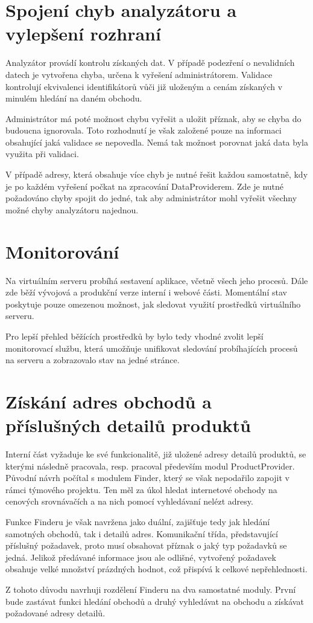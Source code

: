 \documentclass[thesis=B,czech]{FITthesis}[2012/06/26]
\begin{document}
\section{Spojení chyb analyzátoru a vylepšení rozhraní} \label{analyser-join}
Analyzátor provádí kontrolu získaných dat. V případě podezření o nevalidních datech je vytvořena chyba, určena k vyřešení
administrátorem. Validace kontrolují ekvivalenci identifikátorů vůči již uloženým a cenám získaných v minulém hledání na daném obchodu.
\par
Administrátor má poté možnost chybu vyřešit a uložit příznak, aby se chyba do budoucna ignorovala. Toto rozhodnutí je však
založené pouze na informaci obsahující jaká validace se nepovedla. Nemá tak možnost porovnat jaká data byla využita při validaci.
\par
V případě adresy, která obsahuje více chyb je nutné řešit každou samostatně, kdy je po každém vyřešení počkat na zpracování DataProviderem.
Zde je nutné požadováno chyby spojit do jedné, tak aby administrátor mohl vyřešit všechny možné chyby analyzátoru najednou.
\section{Monitorování}
Na virtuálním serveru probíhá sestavení aplikace, včetně všech jeho procesů. Dále zde běží vývojová a produkční verze interní i webové části.
Momentální stav poskytuje pouze omezenou možnost, jak sledovat využití prostředků virtuálního serveru.
\par
Pro lepší přehled běžících prostředků by bylo tedy vhodné zvolit lepší monitorovací službu, která umožňuje unifikovat sledování
probíhajících procesů na serveru a zobrazovalo stav na jedné stránce.

\section{Získání adres obchodů a příslušných detailů produktů}
Interní část vyžaduje ke své funkcionalitě, již uložené adresy detailů produktů, se kterými následně pracovala, resp. pracoval
především modul ProductProvider. Původní návrh počítal s modulem Finder, který se však nepodařilo zapojit v rámci týmového projektu. Ten 
měl za úkol hledat internetové obchody na cenových srovnávačích a na nich pomocí vyhledávaní nelézt adresy.
\par
Funkce Finderu je však navržena jako duální, zajišťuje tedy jak hledání samotných obchodů, tak i detailů adres. Komunikační třída, představující příslušný požadavek, proto musí obsahovat příznak o jaký typ požadavků se jedná. Jelikož předávané informace
jsou ale odlišné, vytvořený požadavek obsahuje velké množství prázdných hodnot, což přispívá k celkové nepřehlednosti.
\par
Z tohoto důvodu navrhuji rozdělení Finderu na dva samostatné moduly. První bude zastávat funkci hledání obchodů a druhý
vyhledávat na obchodu a získávat požadované adresy detailů.
\end{document}

